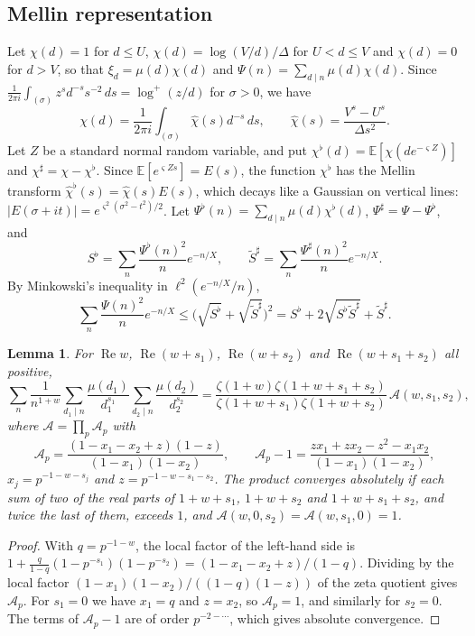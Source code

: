 \documentclass[11pt]{amsart}
\numberwithin{equation}{section}
\newtheorem{lemma}[theorem]{Lemma}
\theoremstyle{definition}
\theoremstyle{remark}
\newcommand{\Rp}{\operatorname{Re}}
\begin{document}
\subsection{Mellin representation}

Let $\chi(d) = 1$ for $d \leq U$, $\chi(d) = \log(V/d)/\Delta$ for $U < d \leq V$ and $\chi(d) = 0$ for $d > V$, so that $\xi_d = \mu(d)\chi(d)$ and $\Psi(n) = \sum_{d\mid n}\mu(d)\chi(d)$.
Since $\frac{1}{2\pi i}\int_{(\sigma)}z^sd^{-s}s^{-2}\,ds = \log^+(z/d)$ for $\sigma > 0$, we have
\[
\chi(d) = \frac1{2\pi i}\int_{(\sigma)}\hat\chi(s)d^{-s}\,ds, \qquad \hat\chi(s) = \frac{V^s - U^s}{\Delta s^2}.
\]
Let $Z$ be a standard normal random variable, and put $\chi^\flat(d) = \mathbb E[\chi(de^{-\varsigma Z})]$ and $\chi^\sharp = \chi - \chi^\flat$.
Since $\mathbb E[e^{\varsigma Zs}] = E(s)$, the function $\chi^\flat$ has the Mellin transform $\hat\chi^\flat(s) = \hat\chi(s)E(s)$, which decays like a Gaussian on vertical lines: $|E(\sigma + it)| = e^{\varsigma^2(\sigma^2 - t^2)/2}$.
Let $\Psi^\flat(n) = \sum_{d\mid n}\mu(d)\chi^\flat(d)$, $\Psi^\sharp = \Psi - \Psi^\flat$, and
\[
S^\flat = \sum_n\frac{\Psi^\flat(n)^2}ne^{-n/X}, \qquad \widetilde S^\sharp = \sum_n\frac{\Psi^\sharp(n)^2}ne^{-n/X}.
\]
By Minkowski's inequality in $\ell^2(e^{-n/X}/n)$,
\begin{equation}\label{eq:mink}
\sum_n\frac{\Psi(n)^2}ne^{-n/X} \leq \big(\sqrt{S^\flat} + \sqrt{\widetilde S^\sharp}\big)^2 = S^\flat + 2\sqrt{S^\flat\widetilde S^\sharp} + \widetilde S^\sharp.
\end{equation}

\begin{lemma}\label{lem:A-euler}
For $\Rp w$, $\Rp(w + s_1)$, $\Rp(w + s_2)$ and $\Rp(w + s_1 + s_2)$ all positive,
\[
\sum_n\frac1{n^{1+w}}\sum_{d_1\mid n}\frac{\mu(d_1)}{d_1^{s_1}}\sum_{d_2\mid n}\frac{\mu(d_2)}{d_2^{s_2}} = \frac{\zeta(1 + w)\zeta(1 + w + s_1 + s_2)}{\zeta(1 + w + s_1)\zeta(1 + w + s_2)}\,\mathcal A(w, s_1, s_2),
\]
where $\mathcal A = \prod_p\mathcal A_p$ with
\[
\mathcal A_p = \frac{(1 - x_1 - x_2 + z)(1 - z)}{(1 - x_1)(1 - x_2)}, \qquad \mathcal A_p - 1 = \frac{zx_1 + zx_2 - z^2 - x_1x_2}{(1 - x_1)(1 - x_2)},
\]
$x_j = p^{-1-w-s_j}$ and $z = p^{-1-w-s_1-s_2}$.
The product converges absolutely if each sum of two of the real parts of $1 + w + s_1$, $1 + w + s_2$ and $1 + w + s_1 + s_2$, and twice the last of them, exceeds $1$, and $\mathcal A(w, 0, s_2) = \mathcal A(w, s_1, 0) = 1$.
\end{lemma}

\begin{proof}
With $q = p^{-1-w}$, the local factor of the left-hand side is $1 + \frac{q}{1-q}(1 - p^{-s_1})(1 - p^{-s_2}) = (1 - x_1 - x_2 + z)/(1 - q)$.
Dividing by the local factor $(1 - x_1)(1 - x_2)/((1 - q)(1 - z))$ of the zeta quotient gives $\mathcal A_p$.
For $s_1 = 0$ we have $x_1 = q$ and $z = x_2$, so $\mathcal A_p = 1$, and similarly for $s_2 = 0$.
The terms of $\mathcal A_p - 1$ are of order $p^{-2-\cdots}$, which gives absolute convergence.
\end{proof}
\end{document}
